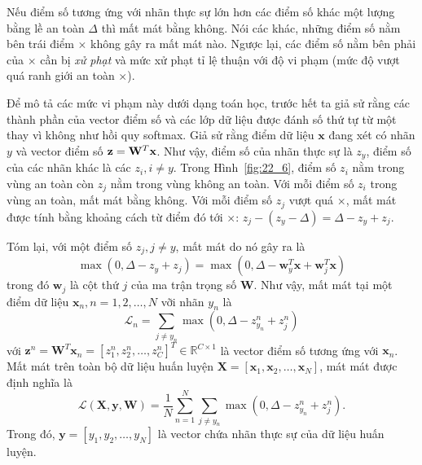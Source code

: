 Nếu điểm số tương ứng với nhãn thực sự lớn hơn các điểm số khác một lượng bằng
lề an toàn $\Delta$ thì mất mát bằng không. Nói các khác, những điểm số nằm bên
trái điểm $\times$ không gây ra mất mát nào. Ngược lại, các điểm số nằm bên phải
của $\times$ cần bị \textit{xử phạt} và mức xử phạt tỉ lệ thuận với độ vi
phạm (mức độ vượt quá ranh giới an toàn $\times$).

Để mô tả các mức vi phạm này dưới dạng toán học, trước hết ta giả sử rằng các
thành phần của vector điểm số và các lớp dữ liệu được đánh số thứ tự từ một thay
vì không như hồi quy softmax. Giả sử rằng điểm dữ liệu $\mathbf{x}$ đang xét có
nhãn $y$ và vector điểm số $\mathbf{z} = \mathbf{W}^T\mathbf{x}$. Như vậy, điểm số của nhãn
thực sự là $z_y$, điểm số của các nhãn khác là các $z_i, i \neq y$. Trong
Hình~\ref{fig:22_6}, điểm số $z_i$ nằm trong vùng an toàn còn $z_j$ nằm trong
vùng không an toàn. Với mỗi điểm số $z_i$ trong vùng an toàn, mất mát bằng
không. Với mỗi điểm số $z_j$ vượt quá $\times$, mất mát được tính bằng khoảng
cách từ điểm đó tới $\times$: $z_j - (z_y - \Delta) =
\Delta - z_y + z_j$.



Tóm lại, với một điểm số $z_j, j \neq y$, mất mát do nó gây ra là
\begin{equation}
\label{eqn:22_1}
\max(0, \Delta - z_y + z_j) = \max(0, \Delta - \mathbf{w}_y^T\mathbf{x} + \mathbf{w}_j^T\mathbf{x})
\end{equation}
trong đó $\mathbf{w}_j$ là {cột} thứ $j$ của ma trận trọng số $\mathbf{W}$.
Như vậy, mất mát tại một điểm dữ liệu $\mathbf{x}_n, n = 1, 2, \dots, N$ vỡi nhãn $y_n$ là
\begin{equation*}
\mathcal{L}_n = \sum_{j \neq y_n} \max(0, \Delta  - z_{y_n}^n + z_j^n)
\end{equation*}
với $\mathbf{z}^n = \mathbf{W}^T\mathbf{x}_n = [z^n_1, z^n_2, \dots,
z^n_C]^T \in \mathbb{R}^{C \times 1}$ là vector điểm số tương ứng với $\mathbf{x}_n$.
Mất mát trên toàn bộ dữ liệu huấn luyện $\mathbf{X} = [\mathbf{x}_1, \mathbf{x}_2, \dots,
\mathbf{x}_N ]$, mát mát được định nghĩa là
\begin{equation}
\label{eqn:22_2}
\mathcal{L}(\mathbf{X}, \mathbf{y}, \mathbf{W}) = \frac{1}{N}\sum_{n=1}^N \sum_{j \neq y_n} \max(0, \Delta - z_{y_n}^n + z_j^n).
\end{equation}
Trong đó, $\mathbf{y} = [y_1, y_2, \dots, y_N]$ là vector chứa nhãn thực sự
của dữ liệu huấn luyện.

